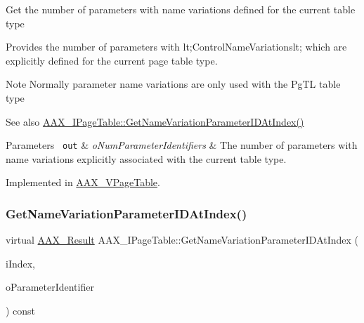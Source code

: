 Get the number of parameters with name variations defined for the current table type

Provides the number of parameters with {\ttfamily lt;Control\+Name\+Variationslt;} which are explicitly defined for the current page table type.

\begin{DoxyNote}{Note}
Normally parameter name variations are only used with the {\ttfamily \textquotesingle{}Pg\+TL\textquotesingle{}} table type
\end{DoxyNote}

\begin{DoxyItemize}
\item \begin{DoxySeeAlso}{See also}
\mbox{\hyperlink{a01849_ac505024dd195c1965c54acac8f1f3016}{A\+A\+X\+\_\+\+I\+Page\+Table\+::\+Get\+Name\+Variation\+Parameter\+I\+D\+At\+Index()}}
\end{DoxySeeAlso}

\begin{DoxyParams}[1]{Parameters}
\mbox{\texttt{ out}}  & {\em o\+Num\+Parameter\+Identifiers} & The number of parameters with name variations explicitly associated with the current table type. \\
\hline
\end{DoxyParams}

\end{DoxyItemize}

Implemented in \mbox{\hyperlink{a01929_a01d73593f2c22f14791f13552ed43ace}{A\+A\+X\+\_\+\+V\+Page\+Table}}.

\mbox{\label{a01849_ac505024dd195c1965c54acac8f1f3016}} 
\subsubsection{\texorpdfstring{GetNameVariationParameterIDAtIndex()}{GetNameVariationParameterIDAtIndex()}}
{\footnotesize\ttfamily virtual \mbox{\hyperlink{a00392_a4d8f69a697df7f70c3a8e9b8ee130d2f}{A\+A\+X\+\_\+\+Result}} A\+A\+X\+\_\+\+I\+Page\+Table\+::\+Get\+Name\+Variation\+Parameter\+I\+D\+At\+Index (\begin{DoxyParamCaption}\item[{int32\+\_\+t}]{i\+Index,  }\item[{\mbox{\hyperlink{a01873}{A\+A\+X\+\_\+\+I\+String}} \&}]{o\+Parameter\+Identifier }\end{DoxyParamCaption}) const\hspace{0.3cm}{\ttfamily [pure virtual]}}

